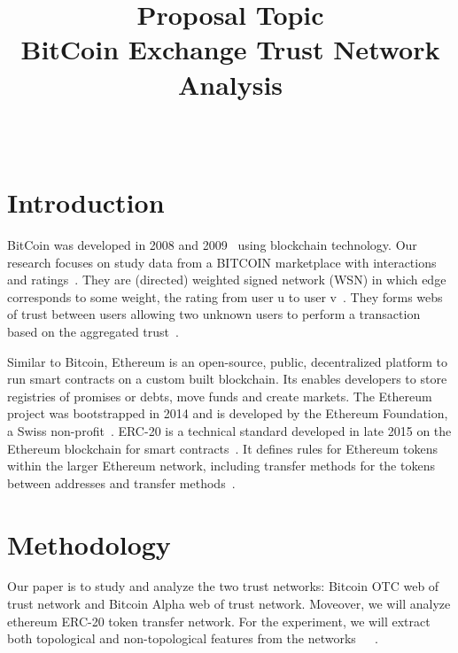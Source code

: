 \documentclass[onecolumn, 12pt]{IEEEtran}
\begin{document}
\title{Proposal Topic \\
BitCoin Exchange Trust Network Analysis
}

\author{\\
}
\maketitle
\section{Introduction}
BitCoin was developed in 2008 and 2009~\cite{nakamoto2008bitcoin} using blockchain technology.
Our research focuses on study data from a BITCOIN marketplace with interactions and ratings~\cite{aw2018analyzing}.
They are (directed) weighted signed network (WSN) in which edge corresponds to some weight, the rating from user u to user v~\cite{moindrot2017trust}.
They forms webs of trust between users allowing two unknown users to perform a transaction based on the aggregated trust~\cite{moindrot2017trust}.

Similar to Bitcoin, Ethereum is an open-source, public, decentralized platform to run smart contracts on a custom built blockchain. Its enables developers to store registries of promises or debts, move funds and create markets. The Ethereum project was bootstrapped in 2014 and is developed by the Ethereum Foundation, a Swiss non-profit~\cite{ethereum}. ERC-20 is a technical standard developed in late 2015 on the Ethereum blockchain for smart contracts~\cite{erc20}. It defines rules for Ethereum tokens within the larger Ethereum network, including transfer methods for the tokens between addresses and transfer methods~\cite{erc20}.
\section{Methodology}
Our paper is to study and analyze the two trust networks: Bitcoin OTC web of trust network and Bitcoin Alpha web of trust network. Moveover, we will analyze ethereum ERC-20 token transfer network.
For the experiment, we will extract both topological and non-topological features from the networks~\cite{liben2007link}~\cite{al2006link}~\cite{davis2011multi}.
\end{document}
